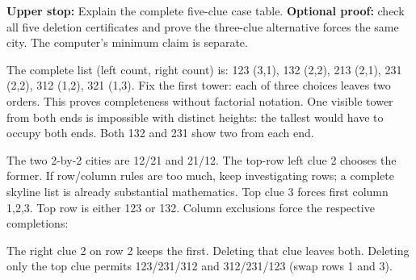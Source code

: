 \documentclass[11pt]{article}
\begin{document}
\textbf{Upper stop:} Explain the complete five-clue case table. \textbf{Optional proof:} check all five deletion certificates and prove the three-clue alternative forces the same city. The computer's minimum claim is separate.

\newpage
{}
The complete list (left count, right count) is: 123 (3,1), 132 (2,2), 213 (2,1), 231 (2,2), 312 (1,2), 321 (1,3). Fix the first tower: each of three choices leaves two orders. This proves completeness without factorial notation. One visible tower from both ends is impossible with distinct heights: the tallest would have to occupy both ends. Both 132 and 231 show two from each end.

The two 2-by-2 cities are 12/21 and 21/12. The top-row left clue 2 chooses the former. If row/column rules are too much, keep investigating rows; a complete skyline list is already substantial mathematics.
Top clue 3 forces first column 1,2,3. Top row is either 123 or 132. Column exclusions force the respective completions:
\begin{center}\begin{minipage}{.47\linewidth}\centering {}\end{minipage}\hfill\begin{minipage}{.47\linewidth}\centering {}\end{minipage}\end{center}
The right clue 2 on row 2 keeps the first. Deleting that clue leaves both. Deleting only the top clue permits 123/231/312 and 312/231/123 (swap rows 1 and 3).
\end{document}
